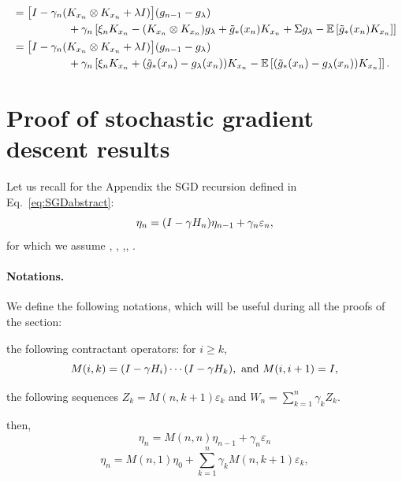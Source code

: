 \begin{align*}
  & =  \big[
I - \gamma_n   (  K_{x_n} \otimes K_{x_n} + \lambda I ) \big]
  ( {g}_{n-1} - g_\lambda )\\
&    \hspace*{1.77cm}     + \gamma_n \left[  \xi_n K_{x_n}  - (K_{x_n} \otimes K_{x_n}) g_\lambda +   \tilde{g}_*(x_n) K_{x_n} + \Sigma g_\lambda - {\mathbb E} \left[ \tilde{g}_*(x_n) K_{x_n} \right] \right] \\ 
    & =  \big[
I - \gamma_n   (  K_{x_n} \otimes K_{x_n} + \lambda I ) \big]
  ( {g}_{n-1} - g_\lambda )  \\
&    \hspace*{1.77cm}   + \gamma_n \left[  \xi_n K_{x_n}   +   (\tilde{g}_*(x_n)- g_\lambda(x_n)) K_{x_n} - {\mathbb E} \left[ (\tilde{g}_*(x_n)- g_\lambda(x_n)) K_{x_n} \right] \right].
\end{align*}

\section{Proof of stochastic gradient descent results} \label{sec:AppSGD}

Let us recall for the Appendix the SGD recursion defined in Eq.~\eqref{eq:SGDabstract}: 
\begin{equation*}
   \eta_n = ( I - \gamma H_n) \eta_{n-1} + \gamma_n \varepsilon_n,
\end{equation*}
for which we assume , , ,, .

\paragraph{Notations.}

We define the following notations, which will be useful during all the proofs of the section: 

\BIT
\item the following contractant operators:  for $i \geqslant k $, $$M(i,k) = (I - \gamma H_i ) \cdots ( I - \gamma H_k), \text{ and } M(i,i+1) = I, $$ 
\item the following sequences $Z_k = M(n,k+1) \varepsilon_k$ and $W_n = \sum_{k=1}^n \gamma_k  Z_k$. 
\EIT

then,
\begin{equation}
 \eta_n =
M(n,n) \eta_{n-1} + \gamma_n \varepsilon_n 
\end{equation}
\begin{equation}
\label{eq:decomposition}
 \eta_n = 
M(n,1)  \eta_0 + \sum_{k=1}^n \gamma_k M(n,k+1) \varepsilon_k,
\end{equation}

